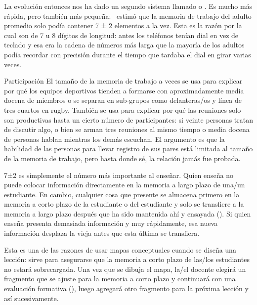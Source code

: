 La evolución entonces nos ha dado un segundo sistema
llamado 
o .
Es mucho más rápida,
pero también más pequeña:~\cite{Mill1956} estimó que la memoria de trabajo del adulto promedio solo podía contener 7 ± 2 elementos a la vez.
Esta es la razón por la cual 
son de 7 u 8 dígitos de longitud:
antes los teléfonos tenían dial en vez de teclado y
esa era la cadena de números más larga que la mayoría de los adultos podía recordar con precisión durante el tiempo que tardaba el dial en girar varias veces.

\begin{aside}{Participación}
  El tamaño de la memoria de trabajo a veces se usa para explicar por qué los equipos 
  deportivos tienden a formarse con aproximadamente media docena de miembros o
  se separan en sub-grupos como delanteras/os y línea de tres cuartos en rugby.
  También se usa para explicar por qué las reuniones solo son productivas hasta un cierto número de participantes:
si veinte personas tratan de discutir algo,
o bien se arman tres reuniones al mismo tiempo
o media docena de personas hablan mientras los demás escuchan.
El argumento es que la habilidad de las personas para llevar registro de sus pares está limitada al tamaño de la memoria de trabajo,
pero hasta donde sé,
la relación jamás fue probada.
\end{aside}

7±2 es simplemente el número más importante al enseñar.
Quien enseña no puede colocar información directamente en la memoria a largo plazo de una/un estudiante.
En cambio,
cualquier cosa que presente se almacena primero en la memoria a corto plazo de la estudiante o del estudiante
y solo se transfiere a la memoria a largo plazo después que ha sido mantenida ahí y ensayada ().
Si quien enseña presenta demasiada información y muy rápidamente,
esa nueva información desplaza la vieja antes que esta última se transfiera.

Esta es una de las razones de usar mapas conceptuales cuando se diseña una lección:
sirve para asegurarse que la memoria a corto plazo de las/los estudiantes no estará sobrecargada.
Una vez que se dibuja el mapa,
la/el docente elegirá un fragmento que se ajuste para la memoria a corto plazo y continuará con una evaluación formativa (),
luego agregará otro fragmento para la próxima lección y así sucesivamente.

